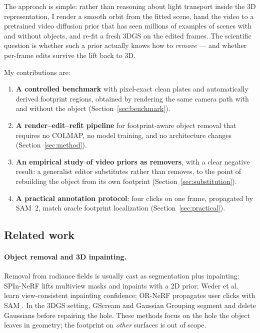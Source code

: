 \documentclass[11pt]{article}
\begin{document}
The approach is simple: rather than reasoning about light transport inside the 3D representation, I render a smooth orbit from the fitted scene, hand the video to a pretrained video diffusion prior that has seen millions of examples of scenes with and without objects, and re-fit a fresh 3DGS on the edited frames. The scientific question is whether such a prior actually knows how to \emph{remove} --- and whether per-frame edits survive the lift back to 3D.

My contributions are:
\begin{enumerate}
  \item \textbf{A controlled benchmark} with pixel-exact clean plates and automatically derived footprint regions, obtained by rendering the same camera path with and without the object (Section~\ref{sec:benchmark}).
  \item \textbf{A render--edit--refit pipeline} for footprint-aware object removal that requires no COLMAP, no model training, and no architecture changes (Section~\ref{sec:method}).
  \item \textbf{An empirical study of video priors as removers}, with a clear negative result: a generalist editor substitutes rather than removes, to the point of rebuilding the object from its own footprint (Section~\ref{sec:substitution}).
  \item \textbf{A practical annotation protocol}: four clicks on one frame, propagated by SAM~2, match oracle footprint localization (Section~\ref{sec:practical}).
\end{enumerate}

\subsection{Related work}
\paragraph{Object removal and 3D inpainting.}
Removal from radiance fields is usually cast as segmentation plus inpainting: SPIn-NeRF \cite{spinnerf} lifts multiview masks and inpaints with a 2D prior; Weder et al.\ \cite{weder} learn view-consistent inpainting confidence; OR-NeRF \cite{ornerf} propagates user clicks with SAM \cite{sam}. In the 3DGS setting, GScream \cite{gscream} and Gaussian Grouping \cite{gaussiangrouping} segment and delete Gaussians before repairing the hole. These methods focus on the hole the object leaves in geometry; the footprint on \emph{other} surfaces is out of scope.
\end{document}
